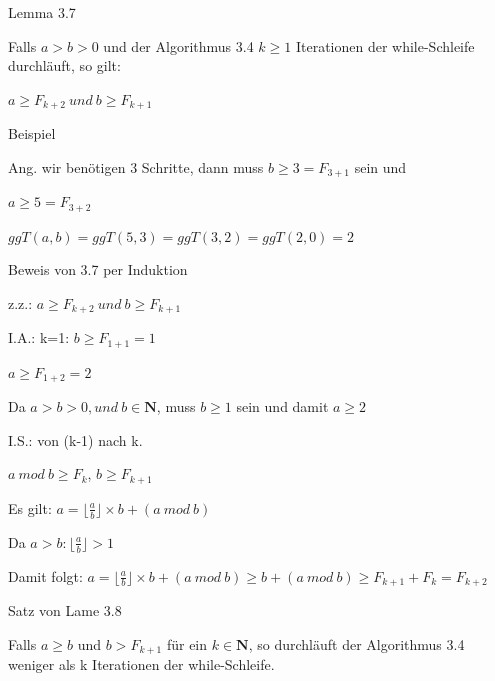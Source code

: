 \documentclass[10pt]{beamer}
\begin{document}
\begin{frame}{Lemma 3.7}

Falls $a > b > 0$ und der Algorithmus 3.4 $k \geq 1$ Iterationen der while-Schleife durchläuft, so gilt: 


\vspace{0.25cm}
$a \geq F_{k+2} \ und \ b \geq F_{k+1}$

    
\end{frame}


\begin{frame}{Beispiel}

Ang. wir benötigen 3 Schritte, dann muss $b \geq 3= F_{3+1}$  sein und 

\noindent $a \geq 5= F_{3+2}$

\vspace{0.3cm}
$ggT(a,b)= ggT(5,3)= ggT(3,2)= ggT(2,0)= 2$ 
    
\end{frame}


\begin{frame}{Beweis von 3.7 per Induktion}

z.z.: $a \geq F_{k+2} \ und \ b \geq F_{k+1}$

\vspace{0.5cm}
 I.A.: k=1: $ b \geq F_{1+1}= 1$


  \indent $a \geq F_{1+2}= 2$

\noindent  Da $a > b > 0, und  \ b \in \mathbf{N}$, muss $b \geq 1$ sein und damit $a \geq 2$


\vspace{0.4cm}
\noindent I.S.: von (k-1) nach k.
\vspace{0.15cm}

$a \ mod \ b \geq F_{k}$, $ b \geq F_{k+1}$

\vspace{0.15cm}

Es gilt: $a= \lfloor \frac{a}{b} \rfloor \times b + (a \ mod \ b)$

\vspace{0.15cm}
Da $a > b: \lfloor \frac{a}{b} \rfloor > 1$ 

\vspace{0.3cm}
\noindent Damit folgt: $a= \lfloor \frac{a}{b} \rfloor \times b + (a \ mod \ b)
\geq b+ (a \ mod  \ b) \geq F_{k+1} + F_{k}= F_{k+2}$

\end{frame}


\begin{frame}{Satz von Lame 3.8}

Falls $a \geq b$ und $b > F_{k+1}$ für ein $k \in \mathbf{N}$, so durchläuft der Algorithmus 3.4 weniger als k Iterationen der while-Schleife.

    
\end{frame}
\end{document}
